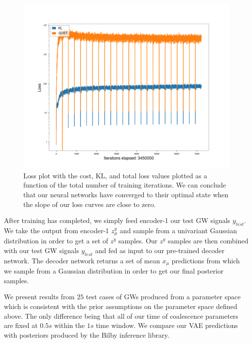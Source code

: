 \documentclass[%
showpacs,
 amsmath,amssymb,
 aps,
 twocolumn,
 prl,
 reprint,
floatfix,
]{revtex4-1}
\begin{document}
%
%
\begin{figure}
    \includegraphics[width=\columnwidth]{images/losses_logscale.png}
    \caption{\label{fig:loss_log} Loss plot with the cost, KL, 
    and total loss values plotted as a function of the total 
    number of training iterations. We can conclude that our 
    neural networks have converged to their optimal state 
    when the slope of our loss curves are close to zero.}
\end{figure}

%
%
After training has completed, we simply feed encoder-1 our test 
GW signals $y_{test}$. We take the output from encoder-1 $z^{y}_{\mu}$ 
and sample from a univariant Gaussian distribution in order to get 
a set of $z^{y}$ samples. Our $z^{y}$ samples are then combined with our 
test GW signals $y_{test}$ and fed as input to our pre-trained decoder 
network. The decoder network returns a set of mean $x_{\mu}$ predictions 
from which we sample from a Gaussian distribution in order to get 
our final posterior samples.

%
%
We present results from $25$ test cases of GWs produced from 
a parameter space which is consistent with the prior assumptions  
on the parameter space defined above. The only difference 
being that all of our time of coalescence parameters are fixed 
at $0.5s$ within the $1s$ time window. We compare our 
VAE predictions with posteriors produced by the Bilby
inference library.
\end{document}
